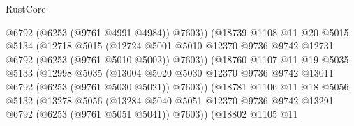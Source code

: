 \begin{lexlean}{RustCore}
\begin{coremodule}
                                  @6792
                                  (@6253 (@9761 @4991 @4984))
                                  @7603))
                              (@18739
                                @1108
                                @11
                                @20
                                @5015
                                @5134
                                (@12718
                                  @5015
                                  (@12724
                                    @5001
                                    @5010
                                    @12370
                                    @9736
                                    @9742
                                    @12731
                                    @6792
                                    (@6253 (@9761 @5010 @5002))
                                    @7603))
                                (@18760
                                  @1107
                                  @11
                                  @19
                                  @5035
                                  @5133
                                  (@12998
                                    @5035
                                    (@13004
                                      @5020
                                      @5030
                                      @12370
                                      @9736
                                      @9742
                                      @13011
                                      @6792
                                      (@6253 (@9761 @5030 @5021))
                                      @7603))
                                  (@18781
                                    @1106
                                    @11
                                    @18
                                    @5056
                                    @5132
                                    (@13278
                                      @5056
                                      (@13284
                                        @5040
                                        @5051
                                        @12370
                                        @9736
                                        @9742
                                        @13291
                                        @6792
                                        (@6253 (@9761 @5051 @5041))
                                        @7603))
                                    (@18802
                                      @1105
                                      @11

\end{coremodule}
\end{lexlean}
